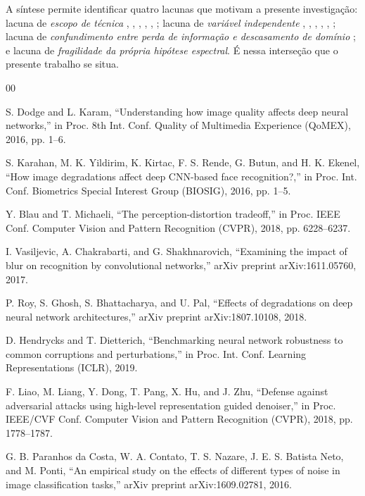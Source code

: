 \documentclass[conference]{IEEEtran}
\begin{document}
A síntese permite identificar quatro lacunas que motivam a presente investigação: lacuna de \emph{escopo de técnica} \cite{b6}, \cite{b7}, \cite{b8}, \cite{b9}, \cite{b26}, \cite{b3}; lacuna de \emph{variável independente} \cite{b1}, \cite{b4}, \cite{b5}, \cite{b28}, \cite{b13}, \cite{b12}; lacuna de \emph{confundimento entre perda de informação e descasamento de domínio} \cite{b23}; e lacuna de \emph{fragilidade da própria hipótese espectral}. É nessa interseção que o presente trabalho se situa.

\begin{thebibliography}{00}

 S. Dodge and L. Karam, ``Understanding how image quality affects
deep neural networks,'' in Proc. 8th Int. Conf. Quality of Multimedia
Experience (QoMEX), 2016, pp. 1--6.

 S. Karahan, M. K. Yildirim, K. Kirtac, F. S. Rende, G. Butun, and
H. K. Ekenel, ``How image degradations affect deep CNN-based face
recognition?,'' in Proc. Int. Conf. Biometrics Special Interest Group
(BIOSIG), 2016, pp. 1--5.

 Y. Blau and T. Michaeli, ``The perception-distortion tradeoff,''
in Proc. IEEE Conf. Computer Vision and Pattern Recognition (CVPR), 2018, pp.
6228--6237.

 I. Vasiljevic, A. Chakrabarti, and G. Shakhnarovich, ``Examining
the impact of blur on recognition by convolutional networks,'' arXiv preprint
arXiv:1611.05760, 2017.

 P. Roy, S. Ghosh, S. Bhattacharya, and U. Pal, ``Effects of
degradations on deep neural network architectures,'' arXiv preprint
arXiv:1807.10108, 2018.

 D. Hendrycks and T. Dietterich, ``Benchmarking neural network
robustness to common corruptions and perturbations,'' in Proc. Int. Conf.
Learning Representations (ICLR), 2019.

 F. Liao, M. Liang, Y. Dong, T. Pang, X. Hu, and J. Zhu, ``Defense
against adversarial attacks using high-level representation guided denoiser,''
in Proc. IEEE/CVF Conf. Computer Vision and Pattern Recognition (CVPR), 2018,
pp. 1778--1787.

 G. B. Paranhos da Costa, W. A. Contato, T. S. Nazare, J. E. S.
Batista Neto, and M. Ponti, ``An empirical study on the effects of different
types of noise in image classification tasks,'' arXiv preprint
arXiv:1609.02781, 2016.


\end{thebibliography}
\end{document}
